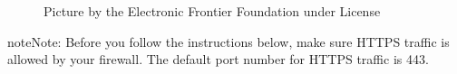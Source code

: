 \documentclass[a4paper,10pt,english,openany,oneside]{sphinxmanual}
\begin{document}
\begin{figure}[H]
\centering
\capstart

\noindent{}
\caption{Picture by the Electronic Frontier Foundation under \sphinxfootnotemark[13] License}\label{\detokenize{joomla-to-vps:id3}}\end{figure}
%
\begin{footnotetext}[13]\label{\thesphinxscope.13}%
\sphinxAtStartFootnote
{}
%
\end{footnotetext}\ignorespaces 
\begin{sphinxadmonition}{note}{Note:}
\sphinxAtStartPar
Before you follow the instructions below, make sure HTTPS traffic is allowed by your firewall. The default port number for HTTPS traffic is 443.
\end{sphinxadmonition}
\end{document}
